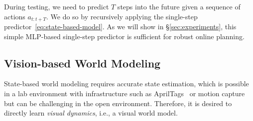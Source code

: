 During testing, we need to predict $T$ steps into the future given a sequence of actions $a_{t:t+T}$. We do so by recursively applying the single-step predictor~\eqref{eq:state-based-model}. As we will show in \S\ref{sec:experiments}, this simple MLP-based single-step predictor is sufficient for robust online planning. 





\subsection{Vision-based World Modeling}
\label{sec:vision-based}

State-based world modeling requires accurate state estimation, which is possible in a lab environment with infrastructure such as AprilTags~\cite{olson2011apriltag} or motion capture but can be challenging in the open environment. Therefore, it is desired to directly learn \emph{visual dynamics}, i.e., a visual world model.

